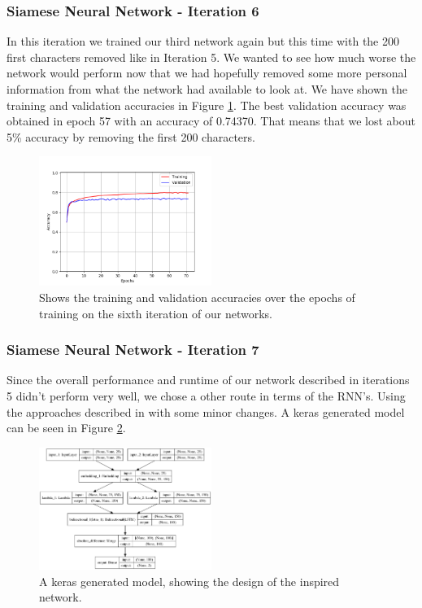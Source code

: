 \subsubsection{Siamese Neural Network - Iteration 6}
\label{subsubsec:siamese_neuraon_network_iteration_6}

In this iteration we trained our third network again but this time with the 200
first characters removed like in Iteration 5. We wanted to see how much worse
the network would perform now that we had hopefully removed some more personal
information from what the network had available to look at. We have shown the
training and validation accuracies in Figure \ref{fig:network_6_accuracies}. The
best validation accuracy was obtained in epoch 57 with an accuracy of 0.74370.
That means that we lost about 5\% accuracy by removing the first 200 characters.

\begin{figure}
    \centering
    \includegraphics[width=0.5\textwidth]{./pictures/experiments/network_6_accuracies.png}
    \caption{Shows the training and validation accuracies over the epochs of
        training on the sixth iteration of our networks.}
    \label{fig:network_6_accuracies}
\end{figure}


\subsubsection{Siamese Neural Network - Iteration 7}

Since the overall performance and runtime of our network described in iterations
5 didn't perform very well, we chose a other route in terms of the \gls{RNN}'s.
Using the approaches described in \cite{qian:2018} with some minor changes. A
keras generated model can be seen in Figure \ref{fig:r_network6}.

\begin{figure}
    \centering
    \includegraphics[width=0.5\textwidth]{./pictures/experiments/network6.png}
    \caption{A keras generated model, showing the design of the \cite{qian:2018}
        inspired network.}
    \label{fig:r_network6}
\end{figure}


